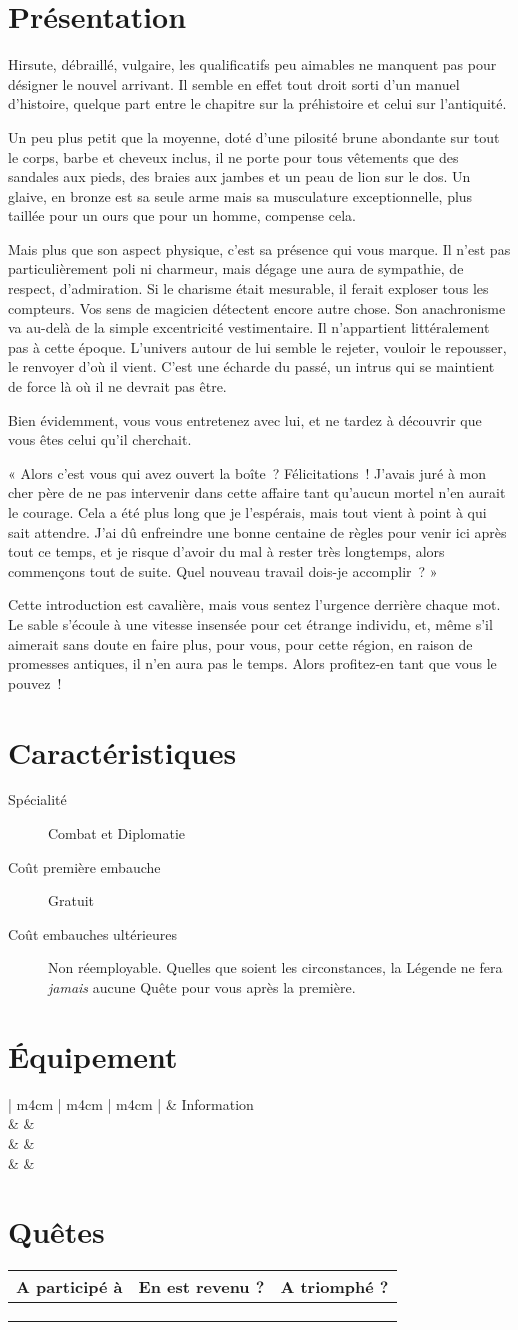 \documentclass{report}
\newcommand{\hero}[5]{
    \herostats{#1}{#2}{#3}{#4}

    \fullbleed{#5}

    \herosheet
}
\newcommand{\herostats}[4]{
    \section{Présentation}

    #1

    \section{Caractéristiques}

    \begin{description}
        \item[Spécialité] #2
        \item[Coût première embauche] #3
        \item[Coût embauches ultérieures] #4
    \end{description}
}
\newcommand{\herosheet}{
    \section{Équipement}

    \begin{tabular}{ | m{4cm} | m{4cm} | m{4cm} | }
        \hline
        \multicolumn{2}{| m{8cm} |}{Équipement} & Information\\
        \hline
        \mytextfield{4cm} & \mytextfield{4cm} & \mytextfield{4cm}\\
        \hline
        \mytextfield{4cm} & \mytextfield{4cm} & \mytextfield{4cm}\\
        \hline
        \mytextfield{4cm} & \mytextfield{4cm} & \mytextfield{4cm}\\
        \hline
    \end{tabular}

    \section{Quêtes}

    \begin{tabular}{ | m{7cm} | m{2.5cm} | m{2.5cm} |}
        \hline
        A participé à & En est revenu ? & A triomphé ?\\
        \hline
        \mytextfield{7cm} & \mycheckbox & \mycheckbox \\ 
        \hline
        \mytextfield{7cm} & \mycheckbox & \mycheckbox \\ 
        \hline
        \mytextfield{7cm} & \mycheckbox & \mycheckbox \\ 
        \hline
    \end{tabular}
}
\begin{document}
\hero{
Hirsute, débraillé, vulgaire, les qualificatifs peu aimables ne manquent pas pour désigner le nouvel arrivant. Il semble en effet tout droit sorti d'un manuel d'histoire, quelque part entre le chapitre sur la préhistoire et celui sur l'antiquité.

Un peu plus petit que la moyenne, doté d'une pilosité brune abondante sur tout le corps, barbe et cheveux inclus, il ne porte pour tous vêtements que des sandales aux pieds, des braies aux jambes et un peau de lion sur le dos. Un glaive, en bronze est sa seule arme mais sa musculature exceptionnelle, plus taillée pour un ours que pour un homme, compense cela.

Mais plus que son aspect physique, c'est sa présence qui vous marque. Il n'est pas particulièrement poli ni charmeur, mais dégage une aura de sympathie, de respect, d'admiration. Si le charisme était mesurable, il ferait exploser tous les compteurs.
Vos sens de magicien détectent encore autre chose. Son anachronisme va au-delà de la simple excentricité vestimentaire. Il n'appartient littéralement pas à cette époque. L'univers autour de lui semble le rejeter, vouloir le repousser, le renvoyer d'où il vient. C'est une écharde du passé, un intrus qui se maintient de force là où il ne devrait pas être.

Bien évidemment, vous vous entretenez avec lui, et ne tardez à découvrir que vous êtes celui qu'il cherchait.

« Alors c'est vous qui avez ouvert la boîte ? Félicitations ! J'avais juré à mon cher père de ne pas intervenir dans cette affaire tant qu'aucun mortel n'en aurait le courage. Cela a été plus long que je l'espérais, mais tout vient à point à qui sait attendre. J'ai dû enfreindre une bonne centaine de règles pour venir ici après tout ce temps, et je risque d'avoir du mal à rester très longtemps, alors commençons tout de suite. Quel nouveau travail dois-je accomplir ? »

Cette introduction est cavalière, mais vous sentez l'urgence derrière chaque mot. Le sable s'écoule à une vitesse insensée pour cet étrange individu, et, même s'il aimerait sans doute en faire plus, pour vous, pour cette région, en raison de promesses antiques, il n'en aura pas le temps. Alors profitez-en tant que vous le pouvez !
}{
Combat et Diplomatie
}{
Gratuit
}{
Non réemployable. Quelles que soient les circonstances, la Légende ne fera \emph{jamais} aucune Quête pour vous après la première.
}{images/legendary.jpg}
\end{document}
